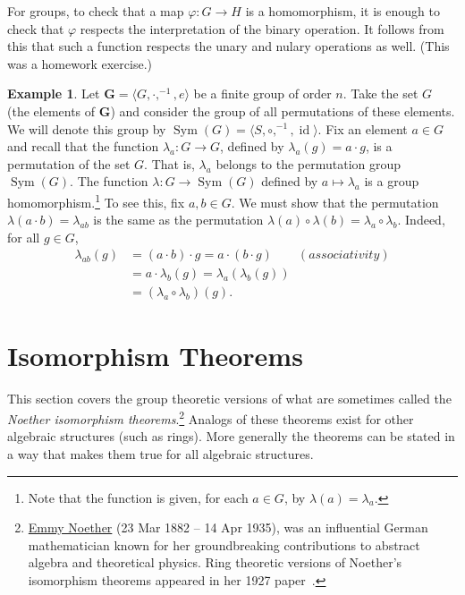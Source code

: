 \documentclass[12pt]{article}
\theoremstyle{plain}
\theoremstyle{definition}
\newtheorem{example}[theorem]{Example}
\theoremstyle{remark}
\theoremstyle{remark}
\numberwithin{theorem}{section}
\numberwithin{equation}{section}
\newcommand{\<}{\ensuremath{\langle}}
\renewcommand{\>}{\ensuremath{\rangle}}
\newcommand{\id}{\ensuremath{\operatorname{id}}}       %
\newcommand{\Sym}{\ensuremath{\operatorname{Sym}}}
\newcommand{\bG}{\ensuremath{\mathbf{G}}}
\begin{document}
\medskip
{} For groups, to check that a map $\varphi: G \rightarrow H$ is a
homomorphism, it is enough to check that $\varphi$ respects the interpretation
of the binary operation. It follows from this that such a function respects the
unary and nulary operations as well. (This was a homework exercise.)



\begin{example}
Let $\bG = \<G, \cdot, ^{-1}, e\>$ be a finite group of order $n$.  
Take the set $G$ (the elements of $\bG$) and consider the group of all
permutations of these elements.  We will denote this group by
$\Sym(G) = \<S, \circ, ^{-1}, \id\>$.
Fix an element $a\in G$ and recall that the function
$\lambda_a: G \rightarrow G$, defined by $\lambda_a(g) = a\cdot g$, is a
permutation of the set $G$.  That is, $\lambda_a$ belongs to the
permutation group $\Sym(G)$.  
The function $\lambda: G \rightarrow \Sym(G)$ defined by 
$a\mapsto \lambda_a$ is a group homomorphism.\footnote{Note that the function
is given, for each $a\in G$, by $\lambda(a) = \lambda_a$.}
To see this, fix $a, b \in G$.  We must show that
the permutation 
$\lambda(a\cdot b) = \lambda_{ab}$
is the same as the permutation 
$\lambda(a) \circ \lambda(b) = \lambda_a \circ \lambda_b$.
Indeed, for all $g \in G$,
\begin{align*}
\lambda_{ab} (g) &= (a\cdot b) \cdot g = a \cdot (b \cdot g) \qquad (associativity)\\
&= a \cdot \lambda_b(g) = \lambda_a (\lambda_b(g)) \\
& = (\lambda_a \circ \lambda_b)(g).
\end{align*}
\end{example}

\section{Isomorphism Theorems}
This section covers the group theoretic versions of what are
sometimes called the \emph{Noether isomorphism theorems}.\footnote{\href{http://en.wikipedia.org/wiki/Emmy_Noether}{Emmy Noether}
(23 Mar 1882 -- 14 Apr 1935), was an influential German mathematician known
  for her groundbreaking contributions to abstract algebra and theoretical
  physics.  Ring theoretic versions of Noether's isomorphism theorems appeared
  in her 1927 paper~\cite{Noether:1927}.}
Analogs of these theorems exist for other algebraic
structures (such as rings). More generally the theorems
can be stated in a way that makes them true for all algebraic structures.  
\end{document}

